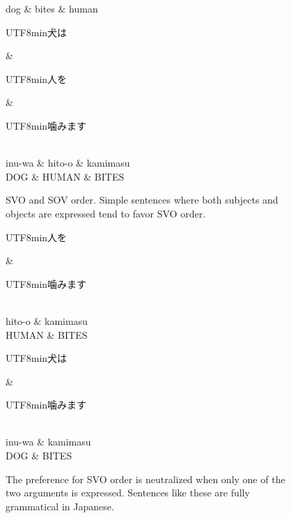 \documentclass[11pt,a4paper]{article}
\newcommand{\japanese}[1]{\begin{CJK}{UTF8}{min}#1\end{CJK}}
\begin{document}
\begin{figure}[ht]
\begin{dependency}[theme = simple]
   \begin{deptext}[column sep=1em]
          dog \& bites \& human  \\
   \end{deptext}
\end{dependency}
\begin{dependency}[theme = simple]
   \begin{deptext}[column sep=1em]
   \japanese{犬は} \& \japanese{人を} \& \japanese{噛みます}\\ 
   inu-wa \& hito-o \& kamimasu \\
          DOG \& HUMAN \& BITES  \\
   \end{deptext}
\end{dependency}



        \caption{SVO and SOV order. Simple sentences where both subjects and objects are expressed tend to favor SVO order.}
        \label{fig:sent-dep}
\end{figure}

\begin{figure}
\begin{dependency}[theme = simple]
   \begin{deptext}[column sep=1em]
   \japanese{人を} \& \japanese{噛みます}\\ 
   hito-o \& kamimasu \\
   HUMAN \& BITES  \\
   \end{deptext}
\end{dependency}
\begin{dependency}[theme = simple]
   \begin{deptext}[column sep=1em]
   \japanese{犬は} \& \japanese{噛みます}\\ 
   inu-wa \& kamimasu \\
          DOG \& BITES  \\
   \end{deptext}
\end{dependency}
    \caption{The preference for SVO order is neutralized when only one of the two arguments is expressed. Sentences like these are fully grammatical in Japanese.}
    \label{fig:my_label}
\end{figure}
\end{document}
